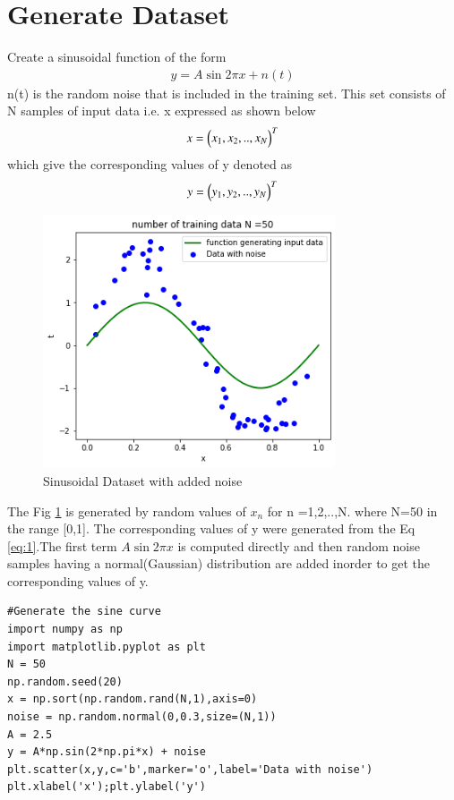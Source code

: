 \documentclass[journal,12pt,twocolumn]{IEEEtran}
\begin{document}
\section{Generate Dataset}
Create a sinusoidal function of the form
\begin{align}
    y = A\sin{2\pi x} + n(t) \label{eq:1}
\end{align}
n(t) is the random noise that is included in the training set. This set consists of N samples of input data i.e. x expressed as shown below
\begin{align}
    x = \begin{pmatrix}x_{1}, x_{2}, .., x_{N}\end{pmatrix}^{T}
\end{align}
which give the corresponding values of y denoted as
\begin{align}
    y = \begin{pmatrix}y_{1}, y_{2}, .., y_{N}\end{pmatrix}^{T}
\end{align}
\begin{figure}[!h]
\begin{center}
\includegraphics[width=3.4in]{figs/x1.png}
\end{center}
\caption{Sinusoidal Dataset with added noise}
\label{fig:1}
\end{figure}
The Fig \ref{fig:1} is generated by random values of $x_{n}$ for n =1,2,..,N.
where N=50 in the range [0,1].
The corresponding values of y were generated from the Eq \eqref{eq:1}.The first term $A\sin{2\pi x}$ is computed directly and then random noise samples having a normal(Gaussian) distribution are added inorder to get the corresponding values of y.
\begin{lstlisting}
#Generate the sine curve 
import numpy as np
import matplotlib.pyplot as plt
N = 50
np.random.seed(20)
x = np.sort(np.random.rand(N,1),axis=0)
noise = np.random.normal(0,0.3,size=(N,1))
A = 2.5
y = A*np.sin(2*np.pi*x) + noise
plt.scatter(x,y,c='b',marker='o',label='Data with noise')
plt.xlabel('x');plt.ylabel('y')
\end{lstlisting}
\end{document}
